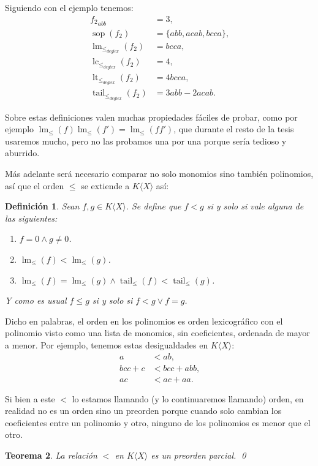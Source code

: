 \documentclass[12pt]{report}
\theoremstyle{customstyle}
\newtheorem{theorem}{Teorema}[chapter]
\newtheorem{definition}[theorem]{Definición}
\theoremstyle{factstyle}
\DeclareMathOperator{\sop}{sop}
\DeclareMathOperator{\lm}{lm}
\DeclareMathOperator{\lc}{lc}
\DeclareMathOperator{\lt}{lt}
\DeclareMathOperator{\tail}{tail}
\begin{document}
Siguiendo con el ejemplo tenemos:
\begin{align*}
  {f_2}_{abb} &= 3 \text{,} \\
  \sop(f_2) &= \{abb, acab, bcca\} \text{,} \\
  \lm_{≤_{deglex}}(f_2) &= bcca \text{,} \\
  \lc_{≤_{deglex}}(f_2) &= 4 \text{,} \\
  \lt_{≤_{deglex}}(f_2) &= 4 bcca \text{,} \\
  \tail_{≤_{deglex}}(f_2) &= 3 abb - 2 acab \text{.}
\end{align*}

Sobre estas definiciones valen muchas propiedades fáciles de probar, como por ejemplo $\lm_≤(f) \lm_≤(f') = \lm_≤(f f')$, que durante el resto de la tesis usaremos mucho, pero no las probamos una por una porque sería tedioso y aburrido.

Más adelante será necesario comparar no solo monomios sino también polinomios, así que el orden $≤$ se extiende a $K⟨X⟩$ así:

\begin{definition}\label{def:orden polinomial}
  Sean $f, g ∈ K⟨X⟩$. Se define que $f < g$ si y solo si vale alguna de las siguientes:
  \begin{enumerate}
    \item $f = 0 ∧ g ≠ 0$.
    \item $\lm_≤(f) < \lm_≤(g)$.
    \item $\lm_≤(f) = \lm_≤(g) ∧ \tail_≤(f) < \tail_≤(g)$.
  \end{enumerate}
  Y como es usual $f ≤ g$ si y solo si $f < g ∨ f = g$.
\end{definition}

Dicho en palabras, el orden en los polinomios es orden lexicográfico con el polinomio visto como una lista de monomios, sin coeficientes, ordenada de mayor a menor. Por ejemplo, tenemos estas desigualdades en $K⟨X⟩$:
\begin{align*}
  a &< ab \text{,} \\
  bcc + c &< bcc + abb \text{,} \\
  ac &< ac + aa \text{.}
\end{align*}

Si bien a este $<$ lo estamos llamando (y lo continuaremos llamando) orden, en realidad no es un orden sino un preorden porque cuando solo cambian los coeficientes entre un polinomio y otro, ninguno de los polinomios es menor que el otro.

\begin{theorem}
  La relación $<$ en $K⟨X⟩$ es un preorden parcial.
  \qed
\end{theorem}
\end{document}
